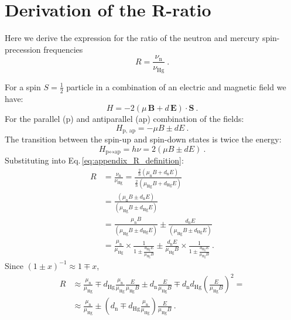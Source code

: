 \manualmark
{} 


\chapter{Derivation of the R-ratio}
\label{ch:R_derivation_appendix}

Here we derive the expression for the ratio of the neutron and mercury spin-precession frequencies
\begin{equation}
  R = \frac{\nu_\text{n}}{\nu_\text{Hg}} \ .
  \label{eq:appendix_R_definition}
\end{equation}

For a spin $S = \tfrac{1}{2}$ particle in a combination of an electric and magnetic field we have:
\begin{equation}
  H = - 2 \left( \mu \, \mathbf{B} + d \, \mathbf{E} \right ) \cdot \mathbf{S} \ .
\end{equation}
For the parallel (p) and antiparallel (ap) combination of the fields:
\begin{equation}
  H_\text{p, ap} = - \mu B \pm d E \ .
\end{equation}
The transition between the spin-up and spin-down states is twice the energy:
\begin{equation}
  H_{\text{p} \leftrightarrow \text{ap} } = h \nu = 2 \left( \mu B \pm d E \right) \ .
\end{equation}
Substituting into Eq.\,\ref{eq:appendix_R_definition}:
\begin{align}
  R &= \frac{\nu_\text{n}}{\nu_\text{Hg}} = \frac{ \frac{2}{h} \left( \mu_\text{n} B + d_\text{n} E \right) }{ \frac{2}{h} \left( \mu_\text{Hg} B + d_\text{Hg} E \right) } \nonumber \\
      &= \frac{ \left( \mu_\text{n} B \pm d_\text{n} E \right) }{ \left( \mu_\text{Hg} B \pm d_\text{Hg} E \right) } \nonumber \\
      &= \frac{ \mu_\text{n} B }{ \left( \mu_\text{Hg} B \pm d_\text{Hg} E \right) } \pm \frac{ d_\text{n} E }{ \left( \mu_\text{Hg} B \pm d_\text{Hg} E \right) } \nonumber \\
      &= \frac{\mu_\text{n}}{\mu_\text{Hg}} \times \frac{1}{ 1 \pm \frac{d_\text{Hg} E}{\mu_\text{Hg} B} } \pm \frac{d_\text{n} E}{\mu_\text{Hg} B} \times \frac{1}{1 \pm \frac{ d_\text{Hg} E }{ \mu_\text{Hg} B}}\ .
\end{align}
Since ${\left(1 \pm x \right)}^{-1} \approx 1 \mp x$,
\begin{align}
  R  &\approx \frac{\mu_\text{n}}{\mu_\text{Hg}} \mp d_\text{Hg} \frac{\mu_\text{n}}{\mu_\text{Hg}} \frac{E}{\mu_\text{Hg} B} \pm d_\text{n} \frac{E}{\mu_\text{Hg} B} \mp d_\text{n} d_\text{Hg} {\left( \frac{E}{\mu_\text{Hg} B} \right)}^2 = \\
      &\approx \frac{\mu_\text{n}}{\mu_\text{Hg}} \pm \left( d_\text{n} \mp  d_\text{Hg} \frac{\mu_\text{n}}{\mu_\text{Hg}} \right) \frac{E}{\mu_\text{Hg} B} \ .
\end{align}
